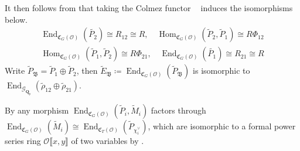 \documentclass[leqno]{amsart}
\newcommand{\B}{\mathfrak B}
\newcommand{\fC}{\mathfrak C}
\DeclareMathOperator{\V}{\check{\mathbf{V}}} %
\newcommand{\Gp}{\mathcal{G}_{\Qp}} %
\newcommand{\Qp}{\mathbf{Q}_p}
\newcommand{\oo}{\mathcal{O}} %
\DeclareMathOperator{\End}{End}
\DeclareMathOperator{\Hom}{Hom}
\theoremstyle{definition}
\theoremstyle{remark}
\begin{document}
It then follows from \cite[Lem 8.10]{pask} that 
taking the Colmez functor 
$\V$ induces the isomorphisms below.
\begin{equation}\label{eq:end_deform}
\begin{split}
	\End_{\fC_{G}(\oo)}(\tilde{P_2})\cong R_{12}\cong R,\quad
	\Hom_{\fC_G(\oo)}(\tilde{P}_2, \tilde{P}_1)\cong R\Phi_{12}\\
	\Hom_{\fC_G(\oo)}(\tilde{P}_1, \tilde{P}_2)\cong R\Phi_{21},\quad
	\End_{\fC_{G}(\oo)}(\tilde{P_1})\cong R_{21}\cong R
\end{split}
\end{equation}
Write $ \tilde{P}_\B=\tilde{P}_1\oplus \tilde{P}_2$,
then $\tilde{E}_\B\coloneqq
\End_{\fC_G(\oo)}(\tilde{P}_\B)$
is isomorphic to 
$\End_{\Gp}(\tilde{\rho}_{12}\oplus \tilde{\rho}_{21})$.



By \cite[Prop 7.1]{pask}
any morphism 
$\End_{\fC_G(\oo)}(\tilde{P}_i, \tilde{M}_i)$
factors through
$\End_{\fC_G(\oo)}(\tilde{M}_i)\cong
\End_{\fC_T(\oo)}(\tilde{P}_{\chi_i^\vee})$,
which are isomorphic to
a formal power series ring
$ \oo\llbracket x,y\rrbracket$
of two variables
by \cite[Prop 3.34]{pask}.
\end{document}
